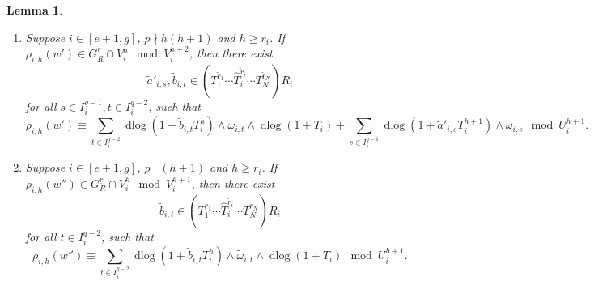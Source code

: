 \documentclass[11pt]{amsart}
\newcommand{\dlog}{\operatorname{dlog}}
\renewcommand{\hat}{\widehat}
\newcommand{\ul}{\underline}
\renewcommand{\tilde}{\widetilde}
\theoremstyle{plain}
\newtheorem{lem}[prop]{Lemma}
\theoremstyle{definition}
\numberwithin{equation}{prop}
\begin{document}
\begin{lem}
\begin{enumerate}
\item \label{lem4(4)}
Suppose $i\in [e+1,g]$, $p\nmid h(h+1)$ and $h\ge r_i$.
If $\rho_{i,h}(w')\in G^{\ul r}_{R}\cap V_i^{h} \mod V_i^{h+2}$,
then there exist
$$
\tilde a'_{i,s},\tilde b_{i,t}\in (T_1^{\tilde r_1}\cdots \hat T_i^{\tilde r_i}\cdots T_N^{\tilde r_N})R_i$$
for all $s\in I_i^{q-1}, t\in I_i^{q-2}$, such that
$$\rho_{i,h}(w')
\equiv
\sum_{t\in I_i^{q-2}} 
\dlog(1+\tilde b_{i,t}T_i^{h})\wedge\tilde \omega_{i,t}\wedge \dlog (1+T_i)
+
\sum_{s\in I_i^{q-1}} \dlog(1+\tilde a'_{i,s}T_i^{h+1})\wedge\tilde\omega_{i,s}
\mod U_i^{h+1}
.$$


\item \label{lem4(5)}
Suppose $i\in [e+1,g]$,  $p\mid (h+1)$ and $h\ge r_i$.
If 
$\rho_{i,h}(w'')\in G^{\ul r}_{R}\cap V_i^{h} \mod V_i^{h+1}$,
then there exist
$$
\tilde b_{i,t}\in (T_1^{\tilde r_1}\cdots \hat T_i^{\tilde r_i}\cdots T_N^{\tilde r_N})R_i$$
for all $t\in I_i^{q-2}$, such that
$$\rho_{i,h}(w'')
\equiv 
\sum_{t\in I_i^{q-2}} 
\dlog(1+\tilde b_{i,t}T_i^{h})\wedge\tilde \omega_{i,t}
\wedge \dlog (1+T_i)
\mod U_i^{h+1}.$$


\end{enumerate}
\end{lem}
\end{document}
